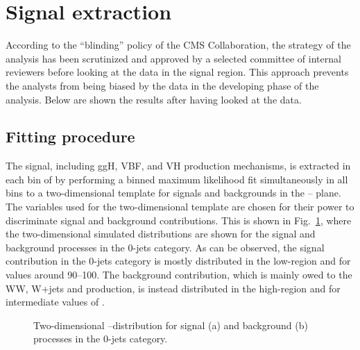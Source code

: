 \section{Signal extraction}
\label{sec:SignalExtraction}

According to the ``blinding'' policy of the CMS Collaboration, the strategy of the analysis has been scrutinized and approved by a selected committee of internal reviewers before looking at the data in the signal region. This approach prevents the analysts from being biased by the data in the developing phase of the analysis. Below are shown the results after having looked at the data.


\subsection{Fitting procedure}\label{sec:fit}

The signal, including ggH, VBF, and VH production mechanisms, is extracted in each bin of \pth{} by performing a binned maximum likelihood fit simultaneously in all \pth{} bins to a two-dimensional template for signals and backgrounds in the \mll--\mt{} plane.
The variables used for the two-dimensional template are chosen for their power to discriminate signal and background contributions. This is shown in Fig.~\ref{fig:2Dlegacy}, where the two-dimensional simulated distributions are shown for the signal and background processes in the 0-jets category. As can be observed, the signal contribution in the 0-jets category is mostly distributed in the low-\mll region and for \mt values around 90--100\GeV. The background contribution, which is mainly owed to the WW, W+jets and \dytt production, is instead distributed in the high-\mll region and for intermediate values of \mt.

\begin{figure}[htb]
\centering
{}
\caption{Two-dimensional \mll--\mt distribution for signal (a) and background (b) processes in the 0-jets category.\label{fig:2Dlegacy}}
\end{figure}

